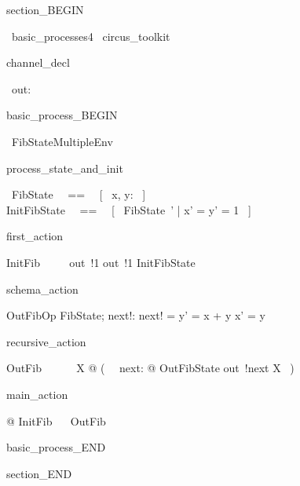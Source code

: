 section_BEGIN
\begin{zsection}
  \SECTION\ basic\_processes4 \parents\ circus\_toolkit
\end{zsection}
channel_decl
\begin{circus}
    \circchannel\ out: \nat
\end{circus}
basic_process_BEGIN
\begin{circus}
    \circprocess\ FibStateMultipleEnv ~~\circdef~~ \circbegin
\end{circus}
process_state_and_init
\begin{circusaction}
    \circstate\ FibState ~~==~~ [~ x, y: \nat ~] \\
    InitFibState ~~==~~ [~ FibState~' | x' = y' = 1 ~]
\end{circusaction}
first_action
\begin{circusaction}
    InitFib ~~\circdef~~ out~!1 \then out~!1 \then InitFibState
\end{circusaction}
schema_action
\begin{schema}{OutFibOp}
    \Delta FibState; next!: \nat
\where
    next! = y' = x + y \land x' = y
\end{schema}
recursive_action
\begin{circusaction}
    OutFib ~~\circdef~~ \circmu\ X @ (~ \circvar\ next: \nat @ OutFibState \circseq out~!next \then X ~)
\end{circusaction}
main_action
\begin{circusaction}
    @ InitFib ~\circseq~ OutFib
\end{circusaction}
basic_process_END
\begin{circus}
    \circend
\end{circus}

section_END
